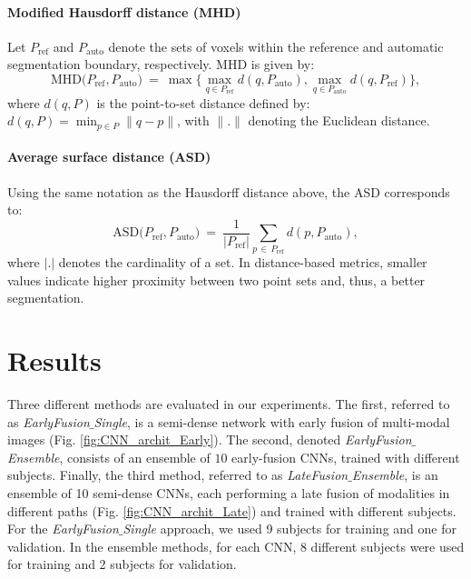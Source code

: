 \documentclass[twoside,espcrc2]{elsarticle}
\newcommand{\mr}[1]{\mathrm{#1}}
\begin{document}
\paragraph{Modified Hausdorff distance (MHD)}

Let $P_\mr{ref}$ and $P_\mr{auto}$ denote the sets of voxels within the reference and automatic segmentation boundary, respectively. MHD is given by:
\begin{equation}
\mr{MHD}\big(P_\mr{ref}, P_\mr{auto} \big) \ = \ \max \Big\{ \max_{q \in P_\mr{ref}}d(q,P_\mr{auto}), \max_{q \in P_\mr{auto}}d(q,P_\mr{ref}) \Big\},
\end{equation}
where $d(q,P)$ is the point-to-set distance defined by: $d(q,P)=\min_{p \in P} \| q-p\|$, with $\|.\|$ denoting the Euclidean distance. 


\paragraph{Average surface distance (ASD)}

Using the same notation as the Hausdorff distance above, the ASD corresponds to:
\begin{equation}
    \mr{ASD}\big(P_\mr{ref}, P_\mr{auto} \big) \ = \ 
     \frac{1}{|P_\mr{ref}|} \sum_{p \, \in \, P_\mr{ref}} 
d(p, P_\mr{auto}),
\end{equation}
where $|.|$ denotes the cardinality of a set. 
In distance-based metrics, smaller values indicate higher proximity between two point sets and, thus, a better segmentation.

\section{Results}\label{sec:results}

Three different methods are evaluated in our experiments. The first, referred to as \textit{EarlyFusion$\_$Single}, is a semi-dense network with early fusion of multi-modal images (Fig. \ref{fig:CNN_archit_Early}). The second, denoted \textit{EarlyFusion$\_$Ensemble}, consists of an ensemble of $10$ early-fusion CNNs, trained with different subjects. Finally, the third method, referred to as \textit{LateFusion$\_$Ensemble}, is an ensemble of 10 semi-dense CNNs, each performing a late fusion of modalities in different paths (Fig. \ref{fig:CNN_archit_Late}) and trained with different subjects. 
For the \textit{EarlyFusion$\_$Single} approach, we used 9 subjects for training and one for validation. In the ensemble methods, for each CNN, 8 different subjects were used for training and 2 subjects for validation.
\end{document}
